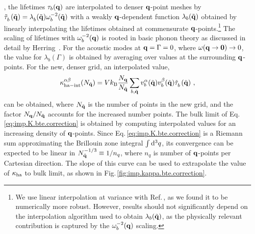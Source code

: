 , the lifetimes $\tau_b ({\bf q})$ are interpolated to denser $\bf q$-point meshes by $\fD{\tilde{\tau}}_b (\tilde{{\bf q}}) = \fD \lambda_b (\tilde{{\bf q}}) \omega_b^{-2} (\tilde {{\bf q}})$ with a weakly $\bf q$-dependent function $\lambda_b (\tilde {{\bf q}})$ obtained by linearly interpolating the lifetimes obtained at commensurate $\bf q$-points.\footnote{We use linear interpolation at variance with Ref.\,\cite{Carbogno.2016}, as we found it to be numerically more robust. However, results should not significantly depend on the interpolation algorithm used to obtain $\lambda_b (\tilde{{\bf q}})$, as the physically relevant contribution is captured by the $\omega_b^{-2} ({\bf q})$  scaling.} The scaling of lifetimes with $\omega_b^{-2} ({\bf q})$ is rooted in basic phonon theory as discussed in detail by Herring~\cite{Herring.1954}. For the acoustic modes at ${\bf q} = \Gamma = 0$, where $\omega ({\bf q \to 0}) \to 0$, the value for $\lambda_b (\Gamma)$ is obtained by averaging over values at the surrounding $\bf q$-points. For the new, denser grid, an interpolated value,
\begin{align}
	\kappa_{\rm ha - int}^{\alpha \beta} (N_{\tilde{\bf q}}) = V k_{\rm B} \frac{N_{\bf q}}{N_{\tilde{\bf q}}} \sum_{b, \tilde{{\bf q}}} v^\alpha_b (\tilde{{\bf q}}) v^{\beta}_b (\tilde{{\bf q}}) \fD{\tilde{\tau}}_b (\tilde{{\bf q}})~,
	\label{eq:imp.K.bte.correction}
\end{align}
can be obtained, where $N_{\tilde{\bf q}}$ is the number of points in the new grid, and the factor $N_{\bf q} / N_{\tilde{\bf q}}$ accounts for the increased number points. The bulk limit of Eq.\,\eqref{eq:imp.K.bte.correction} is obtained by computing interpolated values for an increasing density of $\bf q$-points. Since Eq.\,\eqref{eq:imp.K.bte.correction} is a Riemann sum approximating the Brillouin zone integral $\int {\rm d}^3 q$, its convergence can be expected to be linear in $N_{\tilde{\bf q}}^{-1/3} \equiv 1 / n_q$, where $n_q$ is number of $\bf q$-points per Cartesian direction. The slope of this curve can be used to extrapolate the value of $\kappa_{\rm ha}$ to bulk limit, as shown in Fig.\,\ref{fig:imp.kappa.bte.correction}.
